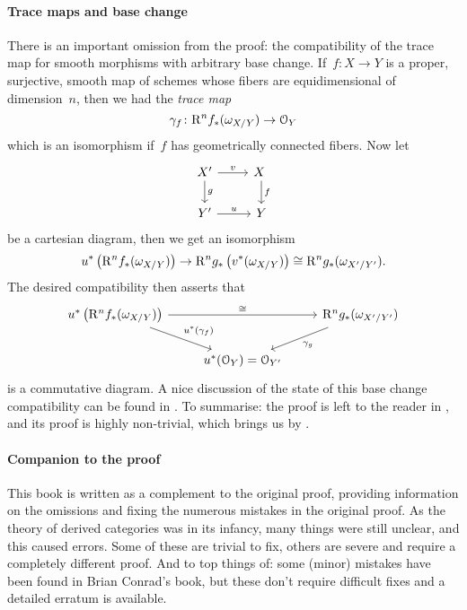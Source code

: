 \documentclass[10pt,a4paper]{article}
\begin{document}
\paragraph{Trace maps and base change}
There is an important omission from the proof: the compatibility of the trace map for smooth morphisms with arbitrary base change. If~$f\colon X\to Y$ is a proper, surjective, smooth map of schemes whose fibers are equidimensional of dimension~$n$, then we had the \emph{trace map} \cite[\S VII.4]{hartshorne-residues-and-duality}
\begin{equation}
  \gamma_f\colon\mathrm{R}^nf_*(\omega_{X/Y})\to\mathcal{O}_Y
\end{equation}
which is an isomorphism if~$f$ has geometrically connected fibers. Now let
\begin{equation}
  \begin{tikzcd}
    X' \arrow{r}{v} \arrow{d}{g} & X \arrow{d}{f} \\
    Y' \arrow{r}{u} & Y
  \end{tikzcd}
\end{equation}
be a cartesian diagram, then we get an isomorphism
\begin{equation}
  u^*\left( \mathrm{R}^nf_*(\omega_{X/Y}) \right)\to\mathrm{R}^ng_*\left( v^*(\omega_{X/Y}) \right)\cong\mathrm{R}^ng_*(\omega_{X'/Y'}).
\end{equation}
The desired compatibility then asserts that
\begin{equation}
  \begin{tikzcd}
    u^*\left( \RR^nf_*(\omega_{X/Y}) \right) \arrow{rr}{\cong} \arrow{rd}{u^*(\gamma_f)} & & \RR^ng_*(\omega_{X'/Y'}) \arrow{ld}{\gamma_{g}} \\
    & u^*(\mathcal{O}_Y)=\mathcal{O}_{Y'}
  \end{tikzcd}
\end{equation}
is a commutative diagram. A nice discussion of the state of this base change compatibility can be found in \cite[\S 1.1]{conrad-grothendieck-duality-and-base-change}. To summarise: the proof is left to the reader in \cite[\S VII.4]{hartshorne-residues-and-duality}, and its proof is highly non-trivial, which brings us by \cite{conrad-grothendieck-duality-and-base-change}.

\paragraph{Companion to the proof}
This book is written as a complement to the original proof, providing information on the omissions and fixing the numerous mistakes in the original proof. As the theory of derived categories was in its infancy, many things were still unclear, and this caused errors. Some of these are trivial to fix, others are severe and require a completely different proof. And to top things of: some (minor) mistakes have been found in Brian Conrad's book, but these don't require difficult fixes and a detailed erratum is available.
\end{document}
